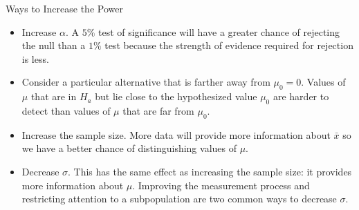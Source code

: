 \documentclass{beamer}\usepackage[]{graphicx}\usepackage[]{color}
\begin{document}
\begin{frame}{Ways to Increase the Power}

  \begin{itemize}
  \item Increase $\alpha$. A $5\%$ test of significance will have a
    greater chance of rejecting the null than a $1\%$ test
    because the strength of evidence required for rejection is less. \pause

  \item Consider a particular alternative that is farther away from
    $\mu_0=0$. Values of $\mu$ that are in $H_a$ but lie close to the
     hypothesized value $\mu_0$ are harder to detect than values of
    $\mu$ that are far from $\mu_0$. \pause

  \item Increase the sample size. More data will provide more
    information about $\bar{x}$ so we have a better chance of
    distinguishing values of $\mu$. \pause

  \item Decrease $\sigma$. This has the same effect as increasing the
    sample size: it provides more information about $\mu$. Improving
    the measurement process and restricting attention to a
    subpopulation are two common ways to decrease $\sigma$. 
  \end{itemize}

\end{frame}
\end{document}
